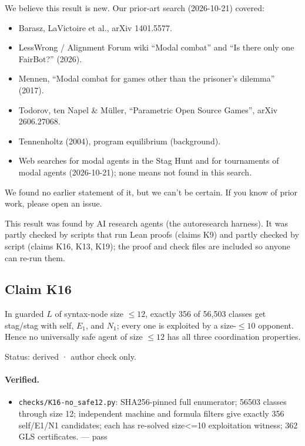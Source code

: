 \documentclass{article}
\begin{document}
We believe this result is new. Our prior-art search (2026-10-21) covered:

\begin{itemize}
\item Barasz, LaVictoire et al., arXiv 1401.5577.
\item LessWrong / Alignment Forum wiki ``Modal combat'' and ``Is there only one FairBot?'' (2026).
\item Mennen, ``Modal combat for games other than the prisoner's dilemma'' (2017).
\item Todorov, ten Napel \& Müller, ``Parametric Open Source Games'', arXiv 2606.27068.
\item Tennenholtz (2004), program equilibrium (background).
\item Web searches for modal agents in the Stag Hunt and for tournaments of modal agents (2026-10-21); none means not found in this search.
\end{itemize}

We found no earlier statement of it, but we can't be certain. If you know of prior work, please open an issue.

This result was found by AI research agents (the autoresearch harness). It was partly checked by scripts that run Lean proofs (claims K9) and partly checked by script (claims K16, K13, K19); the proof and check files are included so anyone can re-run them.

\subsection*{Claim K16}

In guarded $L$ of syntax-node size $\le12$, exactly 356 of 56,503 classes get stag/stag with self, $E_1$, and $N_1$; every one is exploited by a size-$\le10$ opponent. Hence no universally safe agent of size $\le12$ has all three coordination properties.

Status: derived · author check only.

\paragraph{Verified.}
\begin{itemize}
\item \texttt{checks/K16-no\_safe12.py}: SHA256-pinned full enumerator; 56503 classes through size 12; independent machine and formula filters give exactly 356 self/E1/N1 candidates; each has re-solved size\textless{}=10 exploitation witness; 362 GLS certificates. --- pass
\end{itemize}
\end{document}
